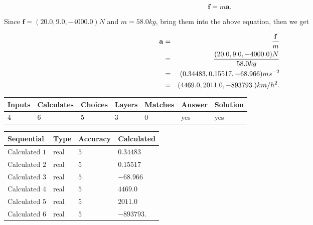 \documentclass[12pt]{article}
\begin{document}
\[
\mathbf{f}=m\mathbf{a}.
\]
 
Since $\mathbf{f}=( %
20.0,  %
9.0,  %
-4000.0 )N$
and $m= %
58.0kg$, bring them into the above equation, then we get
 
\begin{eqnarray*}
\mathbf{a}&=&\frac{\mathbf{f}}m  \\
&=&\frac{(
20.0 ,
9.0 ,
-4000.0 )N
}{ %
58.0 kg}  \\
&=&(
0.34483 ,
0.15517,
-68.966
)ms^{-2} \\
&=&(
4469.0 ,
2011.0 ,
-893793.
)km/h^2.
\end{eqnarray*}
 
 
 
\noindent{}
 
 

 
\vspace{0.3in}
   
   
   
   
\noindent\begin{tabular}{|l|l|l|l|l|l|l|}
 \hline
Inputs & Calculates & Choices & Layers & Matches & Answer & Solution \\ \hline
           4  & 
           6  & 
           5
  & 
           3  & 
           0  & 
  yes & 
  yes 
  \\ \hline
 \end{tabular}
   
   
   
   
\noindent{}
   
   
  
  
\noindent\begin{tabular}{|l|l|l|l|}
\hline
 Sequential & Type & Accuracy & Calculated \\ 
\hline
 
 
  Calculated $            1 $ & real & $            5  $ & 
 $ 0.34483 $ 
 \\  \hline  
 
 
  Calculated $            2 $ & real & $            5  $ & 
 $ 0.15517 $ 
 \\  \hline  
 
 
  Calculated $            3 $ & real & $            5  $ & 
 $ -68.966 $ 
 \\  \hline  
 
 
  Calculated $            4 $ & real & $            5  $ & 
 $ 4469.0 $ 
 \\  \hline  
 
 
  Calculated $            5 $ & real & $            5  $ & 
 $ 2011.0 $ 
 \\  \hline  
 
 
  Calculated $            6 $ & real & $            5  $ & 
 $ -893793. $ 
 \\  \hline  
 \end{tabular}
   
\end{document}
